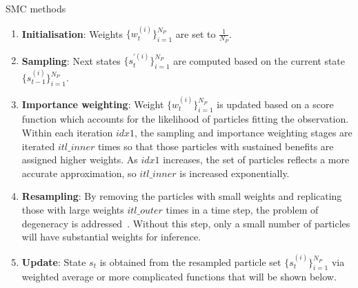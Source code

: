 \begin{algorithm}
\caption{SMC methods}
\footnotesize
\begin{algorithmic}[1]
			 \label{algo:s}
			 \label{algo:i}
		\ENDWHILE
	\ENDFOR
	\ENDIF
\ENDWHILE
{}
\ENDFOR
\end{algorithmic}
\label{algo:smc}
\end{algorithm}

\begin{enumerate}
\item \textbf{Initialisation}: Weights $\{w_t^{(i)}\}^{N_P}_{i=1}$ are set to $\frac{1}{N_P}$.
\item \textbf{Sampling}: Next states $\{s_t^{'(i)}\}^{N_P}_{i=1}$ are computed based on the current state $\{s_{t-1}^{(i)}\}^{N_P}_{i=1}$.
\item \textbf{Importance weighting}: Weight $\{w_t^{(i)}\}^{N_P}_{i=1}$ is updated based on a score function which accounts for the likelihood of particles fitting the observation.
Within each iteration $idx1$, the sampling and importance weighting stages are iterated $itl\_inner$ times so that those particles with sustained benefits are assigned higher weights.
As $idx1$ increases, the set of particles reflects a more accurate approximation, so $itl\_inner$ is increased exponentially.
\item \textbf{Resampling}: By removing the particles with small weights and replicating those with large weights
$itl\_outer$ times in a time step, the problem of degeneracy is addressed~\cite{kitagawa96}. Without this step, only a small number of particles will have substantial weights for inference.
\item \textbf{Update}: State $s_t$ is obtained from the resampled particle set $\{s_t^{(i)}\}^{N_P}_{i=1}$ via weighted average or more complicated functions that will be shown below.
\end{enumerate}


